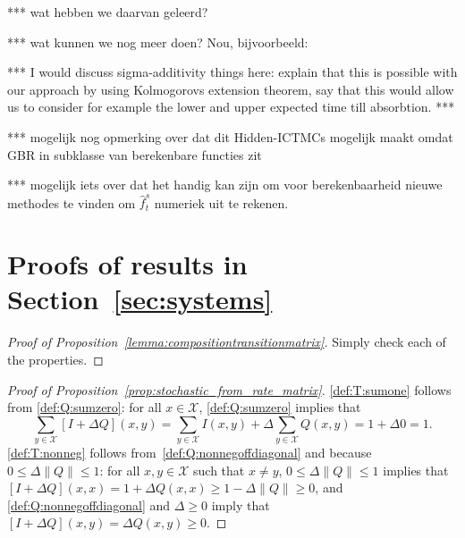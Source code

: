\documentclass[10pt,a4paper]{paper}
\theoremstyle{definition}
\newcommand{\states}{\mathcal{X}}
\newcommand{\norm}[1]{\left\lVert #1 \right\rVert}
\begin{document}
*** wat hebben we daarvan geleerd?

*** wat kunnen we nog meer doen? Nou, bijvoorbeeld:

*** I would discuss sigma-additivity things here: explain that this is possible with our approach by using Kolmogorovs extension theorem, say that this would allow us to consider for example the lower and upper expected time till absorbtion. ***

*** mogelijk nog opmerking over dat dit Hidden-ICTMCs mogelijk maakt omdat GBR in subklasse van berekenbare functies zit

*** mogelijk iets over dat het handig kan zijn om voor berekenbaarheid nieuwe methodes te vinden om $\hat{f}_t^s$ numeriek uit te rekenen.


 


\appendix


\section{Proofs of results in Section~\ref{sec:systems}}\label{app:systems}

\begin{proof}[Proof of Proposition~\ref{lemma:compositiontransitionmatrix}]
Simply check each of the properties.
\end{proof}


\begin{proof}[Proof of Proposition~\ref{prop:stochastic_from_rate_matrix}]
\ref{def:T:sumone} follows from \ref{def:Q:sumzero}: for all $x\in\states$, \ref{def:Q:sumzero} implies that
\begin{equation*}
\sum_{y\in\states} [I + \Delta Q](x,y) = \sum_{y\in\states}I(x,y) + \Delta \sum_{y\in\states}Q(x,y) = 1+\Delta 0=1.
\end{equation*}
\ref{def:T:nonneg} follows from~\ref{def:Q:nonnegoffdiagonal} and because $0\leq \Delta\norm{Q} \leq 1$: for all $x,y\in\states$ such that $x\neq y$, $0\leq\Delta\norm{Q} \leq 1$ implies that $[I+\Delta Q](x,x)=1+\Delta Q(x,x)\geq 1-\Delta\norm{Q}\geq0$, and \ref{def:Q:nonnegoffdiagonal} and $\Delta\geq0$ imply that $[I+\Delta Q](x,y)=\Delta Q(x,y)\geq0$.
\end{proof}
\end{document}
